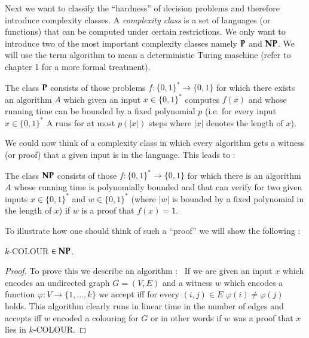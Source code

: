 Next we want to classify the ``hardness'' of decision problems and therefore introduce complexity classes. A \emph{complexity class}
 is a set of languages (or functions) that can be computed under certain restrictions. We only want to introduce two 
 of the most important complexity classes namely $\mathbf{P}$ and $\mathbf{NP}$. We will use the term algorithm
 to mean a deterministic Turing maschine (refer to \cite{Arora2009} chapter 1 for a more formal treatment). 
 
\begin{Definition}
 The class $\mathbf{P}$ consists of those problems $f \colon {\lbrace 0,1 \rbrace}^* \to {\lbrace 0,1 \rbrace}$ for
 which there exists an algorithm $A$ which given an input $x \in {\lbrace 0,1 \rbrace}^*$
 computes $f(x)$ and whose running time can be bounded by a fixed polynomial $p$ (i.e.
 for every input $x \in {\lbrace 0,1 \rbrace}^*$ A runs for at most $p(|x|)$ steps where $|x|$ denotes the length of $x$).
\end{Definition}

We could now think of a complexity class in which every algorithm gets a witness (or proof) that a given input is in the language.
This leads to :

\begin{Definition}
 The class $\mathbf{NP}$ consists of those $f \colon {\lbrace 0,1 \rbrace}^* \to {\lbrace 0,1 \rbrace}$ for which there is
 an algorithm $A$ whose running time is polynomially bounded and that can verify for two given inputs $x \in {\lbrace 0,1 \rbrace}^*$ and 
 $w \in {\lbrace 0,1 \rbrace}^*$ (where $|w|$ is bounded by a fixed polynomial in the length of $x$) if $w$ is a proof
 that $f(x) = 1$.
\end{Definition}

To illustrate how one should think of such a ``proof''  we will show the following :

\begin{Proposition}
 $k$-COLOUR $\in \mathbf{NP}$.
\end{Proposition}

\begin{proof}
 To prove this we describe an algorithm : \
 If we are given an input $x$ which encodes an undirected graph $G = (V,E)$ and a witness $w$ which encodes a 
 function $\varphi \colon V \to \lbrace 1, \dotsc, k \rbrace$ we accept iff for every $(i,j) \in E$  $\varphi(i) \neq \varphi(j)$ holds.
 This algorithm clearly runs in linear time in the number of edges and accepts iff $w$ encoded a  colouring for $G$ or in other words if
 $w$ was a proof that $x$ lies in $k$-COLOUR.
\end{proof}

